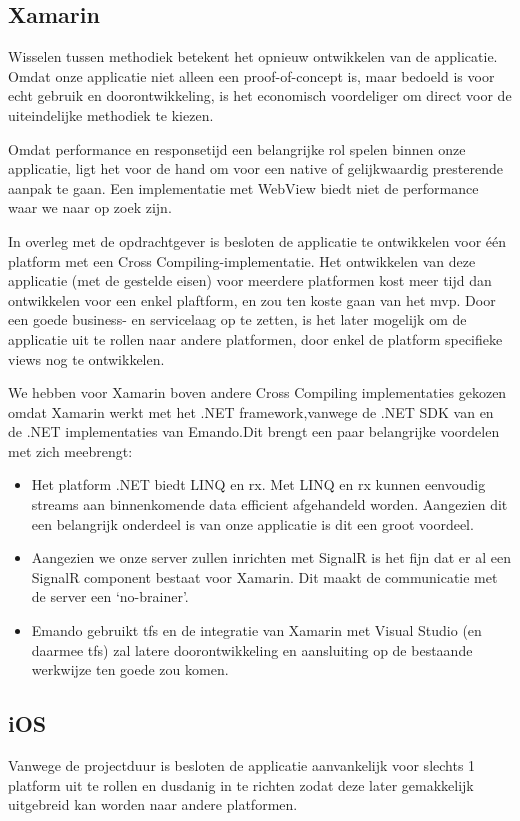 \subsection{Xamarin}
Wisselen tussen methodiek betekent het opnieuw ontwikkelen van de applicatie. Omdat onze applicatie niet alleen een proof-of-concept is, maar bedoeld is voor echt gebruik en doorontwikkeling, is het economisch voordeliger om direct voor de uiteindelijke methodiek te kiezen.
    
Omdat performance en responsetijd een belangrijke rol spelen binnen onze applicatie, ligt het voor de hand om voor een native of gelijkwaardig presterende aanpak te gaan. Een implementatie met WebView biedt niet de performance waar we naar op zoek zijn.
    
In overleg met de opdrachtgever is besloten de applicatie te ontwikkelen voor \'e\'en platform met een Cross Compiling-implementatie. Het ontwikkelen van deze applicatie (met de gestelde eisen) voor meerdere platformen kost meer tijd dan ontwikkelen voor een enkel plaftform, en zou ten koste gaan van het \ac{mvp}. Door een goede business- en servicelaag op te zetten, is het later mogelijk om de applicatie uit te rollen naar andere platformen, door enkel de platform specifieke views nog te ontwikkelen.

We hebben voor Xamarin boven andere Cross Compiling implementaties gekozen omdat Xamarin werkt met het .NET framework,vanwege de .NET SDK van \mylaps en de .NET implementaties van Emando.Dit brengt een paar belangrijke voordelen met zich meebrengt:

\begin{itemize}
    \item Het platform .NET biedt LINQ en \acf{rx}. Met LINQ en \ac{rx} kunnen eenvoudig streams aan binnenkomende data efficient afgehandeld worden. Aangezien dit een belangrijk onderdeel is van onze applicatie is dit een groot voordeel.
    \item Aangezien we onze server zullen inrichten met SignalR is het fijn dat er al een SignalR component bestaat voor Xamarin. Dit maakt de communicatie met de server een `no-brainer'.
    \item Emando gebruikt \acf{tfs} en de integratie van Xamarin met Visual Studio (en daarmee \ac{tfs}) zal latere doorontwikkeling en aansluiting op de bestaande werkwijze ten goede zou komen.
\end{itemize}

\subsection{iOS}
Vanwege de projectduur is besloten de applicatie aanvankelijk voor slechts 1 platform uit te rollen en dusdanig in te richten zodat deze later gemakkelijk uitgebreid kan worden naar andere platformen. 

